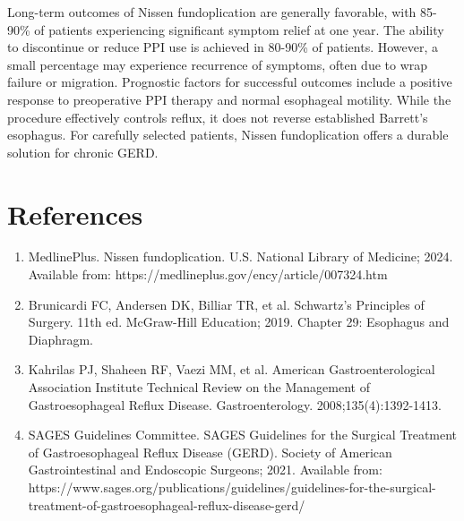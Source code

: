 Long-term outcomes of Nissen fundoplication are generally favorable, with 85-90\% of patients experiencing significant symptom relief at one year. The ability to discontinue or reduce PPI use is achieved in 80-90\% of patients. However, a small percentage may experience recurrence of symptoms, often due to wrap failure or migration. Prognostic factors for successful outcomes include a positive response to preoperative PPI therapy and normal esophageal motility. While the procedure effectively controls reflux, it does not reverse established Barrett's esophagus. For carefully selected patients, Nissen fundoplication offers a durable solution for chronic GERD.

\section*{References}
\begin{enumerate}
  \item MedlinePlus. Nissen fundoplication. U.S. National Library of Medicine; 2024. Available from: https://medlineplus.gov/ency/article/007324.htm
  
  \item Brunicardi FC, Andersen DK, Billiar TR, et al. Schwartz's Principles of Surgery. 11th ed. McGraw-Hill Education; 2019. Chapter 29: Esophagus and Diaphragm.
  
  \setcounter{enumi}{2}
  
  \item Kahrilas PJ, Shaheen RF, Vaezi MM, et al. American Gastroenterological Association Institute Technical Review on the Management of Gastroesophageal Reflux Disease. Gastroenterology. 2008;135(4):1392-1413.
  
  \setcounter{enumi}{3}
  
  \item SAGES Guidelines Committee. SAGES Guidelines for the Surgical Treatment of Gastroesophageal Reflux Disease (GERD). Society of American Gastrointestinal and Endoscopic Surgeons; 2021. Available from: https://www.sages.org/publications/guidelines/guidelines-for-the-surgical-treatment-of-gastroesophageal-reflux-disease-gerd/
\end{enumerate}

\clearpage
